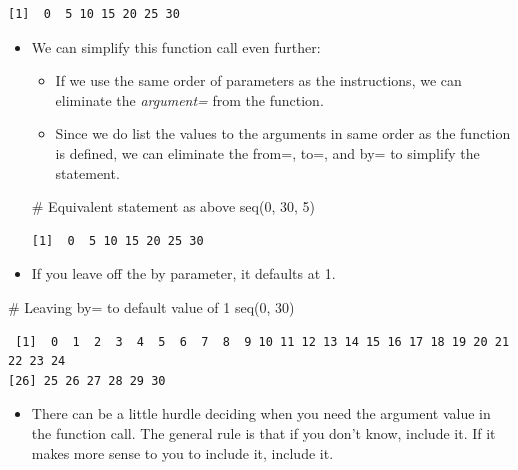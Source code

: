 \documentclass[
  letterpaper,
  DIV=11,
  numbers=noendperiod]{scrreprt}
\newenvironment{Shaded}{\begin{snugshade}}{\end{snugshade}}
\newcommand{\CommentTok}[1]{\textcolor[rgb]{0.37,0.37,0.37}{#1}}
\newcommand{\DecValTok}[1]{\textcolor[rgb]{0.68,0.00,0.00}{#1}}
\newcommand{\FunctionTok}[1]{\textcolor[rgb]{0.28,0.35,0.67}{#1}}
\newcommand{\NormalTok}[1]{\textcolor[rgb]{0.00,0.23,0.31}{#1}}
\providecommand{\tightlist}{%
  \setlength{\itemsep}{0pt}\setlength{\parskip}{0pt}}\usepackage{longtable,booktabs,array}
\begin{document}
\begin{verbatim}
[1]  0  5 10 15 20 25 30
\end{verbatim}

\begin{itemize}
\item
  We can simplify this function call even further:

  \begin{itemize}
  \tightlist
  \item
    If we use the same order of parameters as the instructions, we can
    eliminate the \emph{argument=} from the function.
  \item
    Since we do list the values to the arguments in same order as the
    function is defined, we can eliminate the from=, to=, and by= to
    simplify the statement.
  \end{itemize}

\begin{Shaded}
\begin{Highlighting}[]
\CommentTok{\# Equivalent statement as above}
\FunctionTok{seq}\NormalTok{(}\DecValTok{0}\NormalTok{, }\DecValTok{30}\NormalTok{, }\DecValTok{5}\NormalTok{)}
\end{Highlighting}
\end{Shaded}

\begin{verbatim}
[1]  0  5 10 15 20 25 30
\end{verbatim}
\item
  If you leave off the by parameter, it defaults at 1.
\end{itemize}

\begin{Shaded}
\begin{Highlighting}[]
\CommentTok{\# Leaving by= to default value of 1}
\FunctionTok{seq}\NormalTok{(}\DecValTok{0}\NormalTok{, }\DecValTok{30}\NormalTok{)}
\end{Highlighting}
\end{Shaded}

\begin{verbatim}
 [1]  0  1  2  3  4  5  6  7  8  9 10 11 12 13 14 15 16 17 18 19 20 21 22 23 24
[26] 25 26 27 28 29 30
\end{verbatim}

\begin{itemize}
\tightlist
\item
  There can be a little hurdle deciding when you need the argument value
  in the function call. The general rule is that if you don't know,
  include it. If it makes more sense to you to include it, include it.
\end{itemize}
\end{document}
